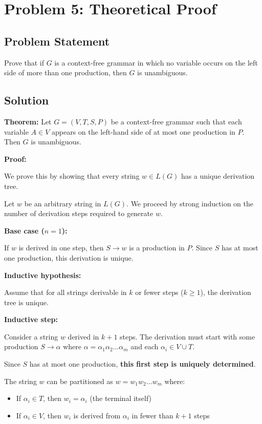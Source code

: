 \documentclass[12pt]{article}
\begin{document}
\section{Problem 5: Theoretical Proof}

\subsection{Problem Statement}
Prove that if $G$ is a context-free grammar in which no variable occurs on the left side of more than one production, then $G$ is unambiguous.

\subsection{Solution}

\textbf{Theorem:} Let $G = (V, T, S, P)$ be a context-free grammar such that each variable $A \in V$ appears on the left-hand side of at most one production in $P$. Then $G$ is unambiguous.

\textbf{Proof:}

We prove this by showing that every string $w \in L(G)$ has a unique derivation tree.

Let $w$ be an arbitrary string in $L(G)$. We proceed by strong induction on the number of derivation steps required to generate $w$.

\textbf{Base case ($n = 1$):}

If $w$ is derived in one step, then $S \to w$ is a production in $P$. Since $S$ has at most one production, this derivation is unique. \checkmark

\textbf{Inductive hypothesis:}

Assume that for all strings derivable in $k$ or fewer steps ($k \geq 1$), the derivation tree is unique.

\textbf{Inductive step:}

Consider a string $w$ derived in $k + 1$ steps. The derivation must start with some production $S \to \alpha$ where $\alpha = \alpha_1 \alpha_2 \ldots \alpha_m$ and each $\alpha_i \in V \cup T$.

Since $S$ has at most one production, \textbf{this first step is uniquely determined}.

The string $w$ can be partitioned as $w = w_1 w_2 \ldots w_m$ where:
\begin{itemize}
\item If $\alpha_i \in T$, then $w_i = \alpha_i$ (the terminal itself)
\item If $\alpha_i \in V$, then $w_i$ is derived from $\alpha_i$ in fewer than $k + 1$ steps
\end{itemize}
\end{document}
